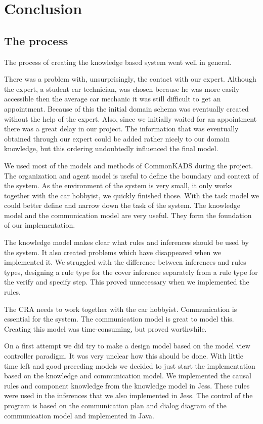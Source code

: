 \section{Conclusion}
\subsection{The process}
The process of creating the knowledge based system went well in general.

There was a problem with, unsurprisingly, the contact with our expert. Although the expert, a student car technician, was chosen because he was more easily accessible then the average car mechanic it was still difficult to get an appointment. Because of this the initial domain schema was eventually created without the help of the expert. Also, since we initially waited for an appointment there was a great delay in our project. The information that was eventually obtained through our expert could be added rather nicely to our domain knowledge, but this ordering undoubtedly influenced the final model.

We used most of the models and methods of CommonKADS during the project. The organization and agent
model is useful to define the boundary and context of the system. As the environment
of the system is very small, it only works together with the car hobbyist, we
quickly finished those. With the task model we could better define and narrow
down the task of the system. The knowledge model and the communication model
are very useful. They form the foundation of our implementation.

The knowledge
model makes clear what rules and inferences should be used by the system. It
also created problems which have disappeared when we implemented it. We struggled
with the
difference between inferences and rules types, designing a rule type for the
cover inference separately from a rule type for the verify and specify step. This
proved unnecessary when we implemented the rules.

The CRA needs to work together with the car hobbyist. Communication is essential
for the system. The communication model is great to model this. Creating this
model was time-consuming, but proved worthwhile.

On a first attempt we did try to make a design model based on the model view controller paradigm.
It was very unclear how this should be done. With little time left and good
preceding models we decided to just start the implementation based on the
knowledge and communication model. We implemented the causal rules and component
knowledge from the knowledge model in Jess. These rules were used in the
inferences that we also implemented in Jess. The control of the program is based
on the communication plan and dialog diagram of the communication model and
implemented in Java.

